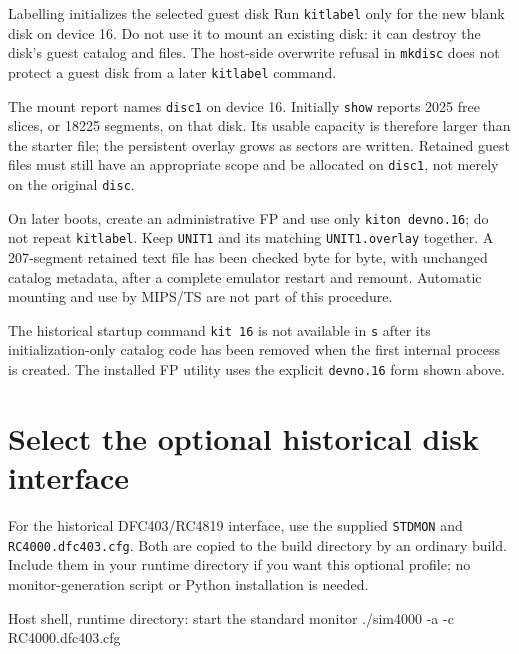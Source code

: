 \begin{operationnote}{Labelling initializes the selected guest disk}
Run \texttt{kitlabel} only for the new blank disk on device 16. Do not use it
to mount an existing disk: it can destroy the disk's guest catalog and files.
The host-side overwrite refusal in \texttt{mkdisc} does not protect a guest
disk from a later \texttt{kitlabel} command.
\end{operationnote}

The mount report names \texttt{disc1} on device 16. Initially \texttt{show}
reports 2025 free slices, or 18225 segments, on that disk. Its usable capacity
is therefore larger than the starter file; the persistent overlay grows as
sectors are written. Retained guest files must still have an appropriate
scope and be allocated on \texttt{disc1}, not merely on the original
\texttt{disc}.

On later boots, create an administrative FP and use only
\texttt{kiton devno.16}; do not repeat \texttt{kitlabel}. Keep \texttt{UNIT1}
and its matching \texttt{UNIT1.overlay} together. A 207-segment retained text
file has been checked byte for byte, with unchanged catalog metadata, after a
complete emulator restart and remount. Automatic mounting and use by MIPS/TS
are not part of this procedure.

The historical startup command \texttt{kit 16} is not available in \texttt{s}
after its initialization-only catalog code has been removed when the first
internal process is created. The installed FP utility uses the explicit
\texttt{devno.16} form shown above.

\section{Select the optional historical disk interface}\label{select-the-optional-historical-disk-interface}

For the historical DFC403/RC4819 interface, use the supplied \texttt{STDMON}
and \texttt{RC4000.dfc403.cfg}. Both are copied to the build directory by an
ordinary build. Include them in your runtime directory if you want this
optional profile; no monitor-generation script or Python installation is needed.

\begin{commandexample}[language=sh]{Host shell, runtime directory: start the standard monitor}
./sim4000 -a -c RC4000.dfc403.cfg
\end{commandexample}

